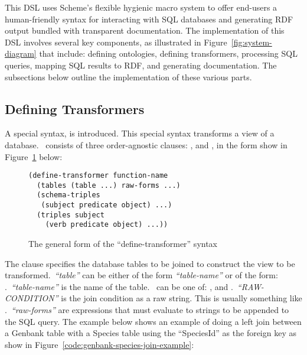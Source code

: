This DSL uses Scheme's flexible hygienic macro system to offer end-users a human-friendly syntax for interacting with SQL databases and generating RDF output bundled with transparent documentation.  The implementation of this DSL involves several key components, as illustrated in Figure~\ref{fig:system-diagram} that include: defining ontologies, defining transformers, processing SQL queries, mapping SQL results to RDF, and generating documentation.  The subsections below outline the implementation of these various parts.

\subsection{Defining Transformers}

A special syntax,  is introduced.  This special syntax transforms a view of a database.\    consists of three order-agnostic clauses: ,  and , in the form show in Figure~\ref{code:define-transformer-syntax} below:

\begin{figure}[H]
\centering
\begin{verbatim}
(define-transformer function-name
  (tables (table ...) raw-forms ...)
  (schema-triples
   (subject predicate object) ...)
  (triples subject
    (verb predicate object) ...))
\end{verbatim}
\caption{The general form of the ``define-transformer'' syntax}\label{code:define-transformer-syntax}
\end{figure}

The  clause specifies the database tables to be joined to construct the view to be transformed.\   \textit{``table''} can be either of the form \textit{``table-name''} or of the form: .\   \textit{``table-name''} is the name of the table.\    can be one of: ,  and .\   \textit{``RAW-CONDITION''} is the join condition as a raw string.  This is usually something like .\   \textit{``raw-forms''} are expressions that must evaluate to strings to be appended to the SQL query.  The example below shows an example of doing a left join between a Genbank table with a Species table using the ``SpeciesId'' as the foreign key as show in Figure~\ref{code:genbank-species-join-example}:

